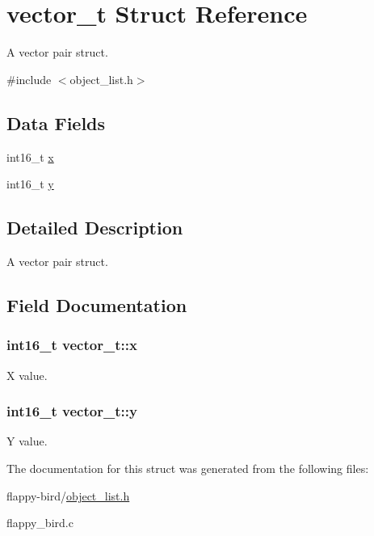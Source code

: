 \hypertarget{structvector__t}{}\section{vector\+\_\+t Struct Reference}
\label{structvector__t}


A vector pair struct.  




{\ttfamily \#include $<$object\+\_\+list.\+h$>$}

\subsection*{Data Fields}
\begin{DoxyCompactItemize}
\item 
int16\+\_\+t \hyperlink{structvector__t_aaba677025136684726ba9652391b94fc}{x}
\item 
int16\+\_\+t \hyperlink{structvector__t_a0bca3dc392c2c1940205980ecfda1260}{y}
\end{DoxyCompactItemize}


\subsection{Detailed Description}
A vector pair struct. 

\subsection{Field Documentation}
\subsubsection[{\texorpdfstring{x}{x}}]{\setlength{\rightskip}{0pt plus 5cm}int16\+\_\+t vector\+\_\+t\+::x}\hypertarget{structvector__t_aaba677025136684726ba9652391b94fc}{}\label{structvector__t_aaba677025136684726ba9652391b94fc}
X value. 
\subsubsection[{\texorpdfstring{y}{y}}]{\setlength{\rightskip}{0pt plus 5cm}int16\+\_\+t vector\+\_\+t\+::y}\hypertarget{structvector__t_a0bca3dc392c2c1940205980ecfda1260}{}\label{structvector__t_a0bca3dc392c2c1940205980ecfda1260}
Y value. 

The documentation for this struct was generated from the following files\+:\begin{DoxyCompactItemize}
\item 
flappy-\/bird/\hyperlink{object__list_8h}{object\+\_\+list.\+h}\item 
flappy\+\_\+bird.\+c\end{DoxyCompactItemize}
